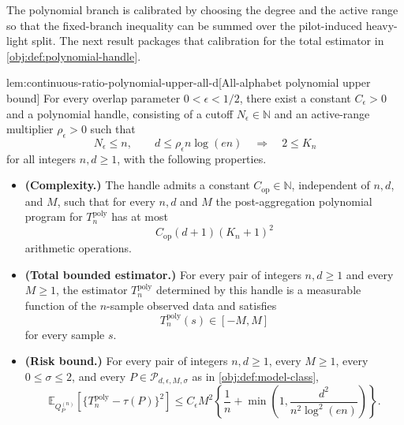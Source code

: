 \documentclass[11pt]{article}
\begin{document}
The polynomial branch is calibrated by choosing the degree and the active range so that the fixed-branch inequality can be summed over the pilot-induced heavy-light split. The next result packages that calibration for the total estimator in \cref{obj:def:polynomial-handle}.

\begin{lemmav}{lem:continuous-ratio-polynomial-upper-all-d}[All-alphabet polynomial upper bound]
For every overlap parameter \(0<\epsilon<1/2\), there exist a constant \(C_{\epsilon}>0\) and a polynomial handle, consisting of a cutoff \(N_{\epsilon}\in\mathbb N\) and an active-range multiplier \(\rho_{\epsilon}>0\) such that
\[
N_{\epsilon}\le n,\qquad d\le \rho_{\epsilon}n\log(en)
\quad\Longrightarrow\quad
2\le K_n
\]
for all integers \(n,d\ge1\), with the following properties.
\begin{itemize}
\item \textbf{(Complexity.)} The handle admits a constant \(C_{\mathrm{op}}\in\mathbb N\), independent of \(n,d\), and \(M\), such that for every \(n,d\) and \(M\) the post-aggregation polynomial program for \(T_n^{\mathrm{poly}}\) has at most
\[
C_{\mathrm{op}}(d+1)(K_n+1)^2
\]
arithmetic operations.
\item \textbf{(Total bounded estimator.)} For every pair of integers \(n,d\ge1\) and every \(M\ge1\), the estimator \(T_n^{\mathrm{poly}}\) determined by this handle is a measurable function of the \(n\)-sample observed data and satisfies
\[
T_n^{\mathrm{poly}}(s)\in[-M,M]
\]
for every sample \(s\).
\item \textbf{(Risk bound.)} For every pair of integers \(n,d\ge1\), every \(M\ge1\), every \(0\le\sigma\le2\), and every \(P\in\mathcal P_{d,\epsilon,M,\sigma}\) as in \cref{obj:def:model-class},
\[
\mathbb E_{Q_P^{(n)}}\!\left[\{T_n^{\mathrm{poly}}-\tau(P)\}^2\right]
\le
C_{\epsilon}M^2
\left\{
\frac{1}{n}
+
\min\!\left(1,\frac{d^2}{n^2\log^2(en)}\right)
\right\}.
\]
\end{itemize}
\end{lemmav}
\end{document}
